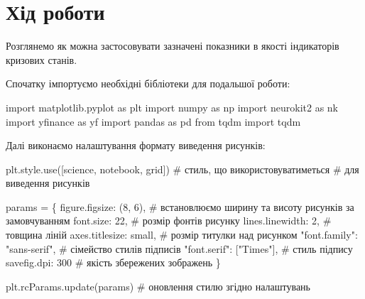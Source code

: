 \documentclass[
  letterpaper,
]{report}
\newenvironment{Shaded}{\begin{snugshade}}{\end{snugshade}}
\newcommand{\CommentTok}[1]{\textcolor[rgb]{0.37,0.37,0.37}{#1}}
\newcommand{\DecValTok}[1]{\textcolor[rgb]{0.68,0.00,0.00}{#1}}
\newcommand{\ImportTok}[1]{\textcolor[rgb]{0.00,0.46,0.62}{#1}}
\newcommand{\NormalTok}[1]{\textcolor[rgb]{0.00,0.23,0.31}{#1}}
\newcommand{\OperatorTok}[1]{\textcolor[rgb]{0.37,0.37,0.37}{#1}}
\newcommand{\StringTok}[1]{\textcolor[rgb]{0.13,0.47,0.30}{#1}}
\begin{document}
\hypertarget{ux445ux456ux434-ux440ux43eux431ux43eux442ux438-5}{%
\section{Хід
роботи}\label{ux445ux456ux434-ux440ux43eux431ux43eux442ux438-5}}

Розглянемо як можна застосовувати зазначені показники в якості
індикаторів кризових станів.

Спочатку імпортуємо необхідні бібліотеки для подальшої роботи:

\begin{Shaded}
\begin{Highlighting}[]
\ImportTok{import}\NormalTok{ matplotlib.pyplot }\ImportTok{as}\NormalTok{ plt }
\ImportTok{import}\NormalTok{ numpy }\ImportTok{as}\NormalTok{ np}
\ImportTok{import}\NormalTok{ neurokit2 }\ImportTok{as}\NormalTok{ nk}
\ImportTok{import}\NormalTok{ yfinance }\ImportTok{as}\NormalTok{ yf}
\ImportTok{import}\NormalTok{ pandas }\ImportTok{as}\NormalTok{ pd}
\ImportTok{from}\NormalTok{ tqdm }\ImportTok{import}\NormalTok{ tqdm}
\end{Highlighting}
\end{Shaded}

Далі виконаємо налаштування формату виведення рисунків:

\begin{Shaded}
\begin{Highlighting}[]
\NormalTok{plt.style.use([}\StringTok{\textquotesingle{}science\textquotesingle{}}\NormalTok{, }\StringTok{\textquotesingle{}notebook\textquotesingle{}}\NormalTok{, }\StringTok{\textquotesingle{}grid\textquotesingle{}}\NormalTok{]) }\CommentTok{\# стиль, що використовуватиметься}
                                               \CommentTok{\# для виведення рисунків}

\NormalTok{params }\OperatorTok{=}\NormalTok{ \{}
    \StringTok{\textquotesingle{}figure.figsize\textquotesingle{}}\NormalTok{: (}\DecValTok{8}\NormalTok{, }\DecValTok{6}\NormalTok{),         }\CommentTok{\# встановлюємо ширину та висоту рисунків за замовчуванням}
    \StringTok{\textquotesingle{}font.size\textquotesingle{}}\NormalTok{: }\DecValTok{22}\NormalTok{,                  }\CommentTok{\# розмір фонтів рисунку}
    \StringTok{\textquotesingle{}lines.linewidth\textquotesingle{}}\NormalTok{: }\DecValTok{2}\NormalTok{,             }\CommentTok{\# товщина ліній}
    \StringTok{\textquotesingle{}axes.titlesize\textquotesingle{}}\NormalTok{: }\StringTok{\textquotesingle{}small\textquotesingle{}}\NormalTok{,        }\CommentTok{\# розмір титулки над рисунком}
    \StringTok{"font.family"}\NormalTok{: }\StringTok{"sans{-}serif"}\NormalTok{,      }\CommentTok{\# сімейство стилів підписів }
    \StringTok{"font.serif"}\NormalTok{: [}\StringTok{"Times"}\NormalTok{],          }\CommentTok{\# стиль підпису}
    \StringTok{\textquotesingle{}savefig.dpi\textquotesingle{}}\NormalTok{: }\DecValTok{300}                \CommentTok{\# якість збережених зображень}
\NormalTok{\}}

\NormalTok{plt.rcParams.update(params)           }\CommentTok{\# оновлення стилю згідно налаштувань}
\end{Highlighting}
\end{Shaded}
\end{document}
